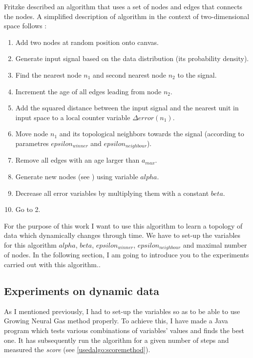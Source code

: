 Fritzke described an algorithm that uses a set of nodes and edges that connects the nodes. A simplified description of algorithm in the context of two-dimensional space follows \cite{Fritzke:gng}:

\begin{enumerate}
\item Add two nodes at random position onto canvas.
\item Generate input signal based on the data distribution (its probability density).
\item Find the nearest node $n_1$ and second nearest node $n_2$ to the signal.
\item Increment the age of all edges leading from node $n_2$.
\item Add the squared distance between the input signal and the nearest unit in input space to a local counter variable $\Delta error(n_{1})$.
\item Move node $n_1$ and its topological neighbors towards the signal (according to parametres $epsilon_{winner}$ and $epsilon_{neighbour}$).
\item Remove all edges with an age larger than $a_{max}$.
\item Generate new nodes (see \cite{Fritzke:gng}) using variable $alpha$.
\item Decrease all error variables by multiplying them with a constant $beta$.
\item Go to 2.
\end{enumerate}

For the purpose of this work I want to use this algorithm to learn a topology of data which dynamically changes through time. We have to set-up the variables for this algorithm $alpha$, $beta$, $epsilon_{winner}$, $epsilon_{neighbour}$ and maximal number of nodes. In the following section, I am going to introduce you to the experiments carried out with this algorithm..

\subsection{Experiments on dynamic data}

As I mentioned previously, I had to set-up the variables so as to be able to use Growing Neural Gas method properly. To achieve this, I have made a Java program which tests various combinations of variables' values and finds the best one. It has subsequently run the algorithm for a given number of steps and measured the \emph{score} (see \ref{usedalgo:scoremethod}).

